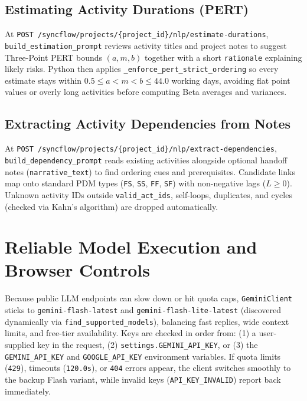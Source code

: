 \subsection{Estimating Activity Durations (PERT)}
At \texttt{POST /syncflow/\allowbreak projects/\allowbreak \{project\_id\}/\allowbreak nlp/\allowbreak estimate-\allowbreak durations}, \texttt{build\_\allowbreak estimation\_\allowbreak prompt} reviews activity titles and project notes to suggest Three-Point PERT bounds $(a, m, b)$ together with a short \texttt{rationale} explaining likely risks. Python then applies \texttt{\_enforce\_\allowbreak pert\_\allowbreak strict\_\allowbreak ordering} so every estimate stays within $0.5 \le a < m < b \le 44.0$ working days, avoiding flat point values or overly long activities before computing Beta averages and variances.

\newpage

\subsection{Extracting Activity Dependencies from Notes}
At \texttt{POST /syncflow/\allowbreak projects/\allowbreak \{project\_id\}/\allowbreak nlp/\allowbreak extract-\allowbreak dependencies}, \texttt{build\_\allowbreak dependency\_\allowbreak prompt} reads existing activities alongside optional handoff notes (\texttt{narrative\_text}) to find ordering cues and prerequisites. Candidate links map onto standard PDM types (\texttt{FS}, \texttt{SS}, \texttt{FF}, \texttt{SF}) with non-negative lags ($L \ge 0$). Unknown activity IDs outside \texttt{valid\_\allowbreak act\_\allowbreak ids}, self-loops, duplicates, and cycles (checked via Kahn's algorithm) are dropped automatically.

\vspace{6mm}

\section{Reliable Model Execution and Browser Controls}
Because public LLM endpoints can slow down or hit quota caps, \texttt{GeminiClient} sticks to \texttt{gemini-\allowbreak flash-\allowbreak latest} and \texttt{gemini-\allowbreak flash-\allowbreak lite-\allowbreak latest} (discovered dynamically via \texttt{find\_\allowbreak supported\_\allowbreak models}), balancing fast replies, wide context limits, and free-tier availability. Keys are checked in order from: (1) a user-supplied key in the request, (2) \texttt{settings.\allowbreak GEMINI\_\allowbreak API\_\allowbreak KEY}, or (3) the \texttt{GEMINI\_\allowbreak API\_\allowbreak KEY} and \texttt{GOOGLE\_\allowbreak API\_\allowbreak KEY} environment variables. If quota limits (\texttt{429}), timeouts (\texttt{120.0s}), or \texttt{404} errors appear, the client switches smoothly to the backup Flash variant, while invalid keys (\texttt{API\_\allowbreak KEY\_\allowbreak INVALID}) report back immediately.

